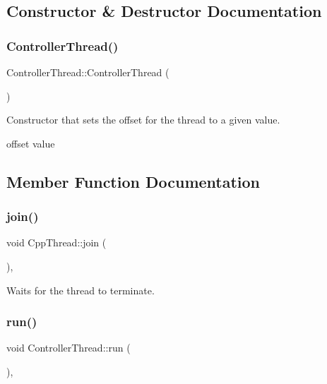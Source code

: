 \subsection{Constructor \& Destructor Documentation}
\mbox{\label{classControllerThread_a00cd6502504f5f1e680e6be3f60a987d}} 
\subsubsection{\texorpdfstring{Controller\+Thread()}{ControllerThread()}}
{\footnotesize\ttfamily Controller\+Thread\+::\+Controller\+Thread (\begin{DoxyParamCaption}{ }\end{DoxyParamCaption})\hspace{0.3cm}{\ttfamily [inline]}}

Constructor that sets the offset for the thread to a given value.

offset value 

\subsection{Member Function Documentation}
\mbox{\label{classCppThread_a8ff0fda6b913cc53764caef0e1200f3f}} 
\subsubsection{\texorpdfstring{join()}{join()}}
{\footnotesize\ttfamily void Cpp\+Thread\+::join (\begin{DoxyParamCaption}{ }\end{DoxyParamCaption})\hspace{0.3cm}{\ttfamily [inline]}, {\ttfamily [inherited]}}

Waits for the thread to terminate. \mbox{\label{classControllerThread_ae8206a23ab1a414f2956424def2e759c}} 
\subsubsection{\texorpdfstring{run()}{run()}}
{\footnotesize\ttfamily void Controller\+Thread\+::run (\begin{DoxyParamCaption}{ }\end{DoxyParamCaption})\hspace{0.3cm}{\ttfamily [private]}, {\ttfamily [virtual]}}

